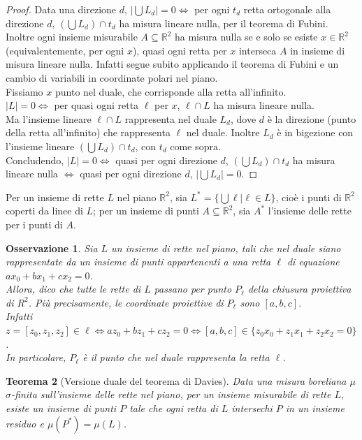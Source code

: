 \documentclass[a4paper, twoside,openright]{article}
\newcommand{\LRa}{\Leftrightarrow}
\newcommand{\R}{\mathbb{R}}
\newcommand{\<}{\langle}
\renewcommand{\>}{\rangle}
\newtheorem{teo}{Teorema}[]
\newtheorem{oss}[teo]{Osservazione}
\begin{document}
\begin{proof}
	Data una direzione $d$, $|\bigcup L_{d}|=0 \LRa$ per ogni $t_d$ retta ortogonale alla direzione $d$, $ (\bigcup L_d) \cap t_d$ ha misura lineare nulla, per il teorema di Fubini.\\
	Inoltre ogni insieme misurabile $A \subseteq \R^2$ ha misura nulla se e solo se esiste $x \in \R^2$ (equivalentemente, per ogni $x$), quasi ogni retta per $x$ interseca $A$ in insieme di misura lineare nulla. Infatti segue subito applicando il teorema di Fubini e un cambio di variabili in coordinate polari nel piano.\\
	Fissiamo $x$ punto nel duale, che corrisponde alla retta all'infinito.\\
	$|L|=0 \LRa$ per quasi ogni retta $\ell$ per $x$, $\ell \cap L$ ha misura lineare nulla.\\
	Ma l'insieme lineare $\ell \cap L$ rappresenta nel duale $L_d$, dove $d$ è la direzione (punto della retta all'infinito) che rappresenta $\ell$ nel duale. Inoltre $L_d$ è in bigezione con l'insieme lineare $(\bigcup L_d) \cap t_d$, con $t_d$ come sopra.\\
	Concludendo, $|L|=0 \LRa$ quasi per ogni direzione $d$, $(\bigcup L_d) \cap t_d$ ha misura lineare nulla $\LRa$ quasi per ogni direzione $d$, $|\bigcup L_d|=0$.
\end{proof}	

Per un insieme di rette $L$ nel piano $\R^2$, sia $L^{*}= \{\bigcup \ell | \ell \in L\}$, cioè i punti di $\R^2$ coperti da linee di $L$; per un insieme di punti $A \subseteq \R^2$, sia $A^{*}$ l'insieme delle rette per i punti di $A$.

\begin{oss}
	Sia $L$ un insieme di rette nel piano, tali che nel duale siano rappresentate da un insieme di punti appartenenti a una retta $\ell$ di equazione $ax_0+bx_1+cx_2=0$.\\
	Allora, dico che tutte le rette di $L$ passano per punto $P_{\ell}$ della chiusura proiettiva di $R^2$. Più precisamente, le coordinate proiettive di $P_{\ell}$ sono $[a,b,c]$.\\
	Infatti $z=[z_0,z_1,z_2] \in \ell \LRa az_0+bz_1+cz_2=0 \LRa [a,b,c] \in \{z_0x_0+z_1x_1+z_2x_2=0\}$.\\
	In particolare, $P_{\ell}$ è il punto che nel duale rappresenta la retta $\ell$.
\end{oss}

\begin{teo}[Versione duale del teorema di Davies]
	Data una misura boreliana $\mu$ $\sigma$-finita sull'insieme delle rette nel piano, per un insieme misurabile di rette $L$, esiste un insieme di punti $P$ tale che ogni retta di $L$ intersechi $P$ in un insieme residuo e $\mu(P^*)=\mu(L)$.
\end{teo}
\end{document}
